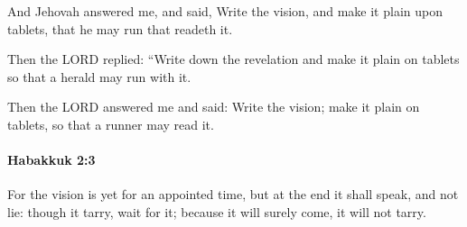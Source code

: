			\begin{versebox}
					\item[BHS] 
					\item[LXX] 
					\item[ASV] And Jehovah answered me, and said, Write the vision, and make it plain upon tablets, that he may run that readeth it.
					\item[NIV] Then the LORD replied: “Write down the revelation and make it plain on tablets so that a herald may run with it.
					\item[NRSV] Then the LORD answered me and said: Write the vision; make it plain on tablets, so that a runner may read it.
			\end{versebox}

		\paragraph{Habakkuk 2:3} %
			\label{HABAKKUK-2-3}

			For the vision is yet for an appointed time, but at the end it shall speak, and not lie: though it tarry, wait for it; because it will surely come, it will not tarry.


